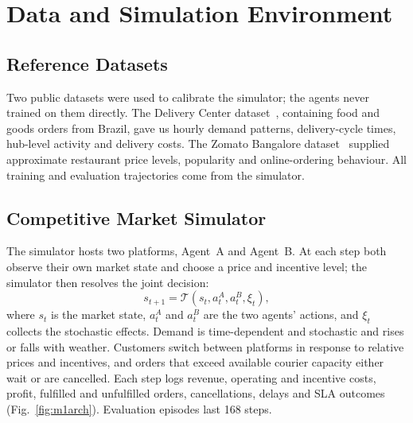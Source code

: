 \documentclass[conference]{IEEEtran}
\begin{document}
\section{Data and Simulation Environment}

\subsection{Reference Datasets}
Two public datasets were used to calibrate the simulator; the agents never trained on them directly. The Delivery Center dataset~\cite{deliverycenter}, containing food and goods orders from Brazil, gave us hourly demand patterns, delivery-cycle times, hub-level activity and delivery costs. The Zomato Bangalore dataset~\cite{zomato} supplied approximate restaurant price levels, popularity and online-ordering behaviour. All training and evaluation trajectories come from the simulator.

\subsection{Competitive Market Simulator}
The simulator hosts two platforms, Agent~A and Agent~B. At each step both observe their own market state and choose a price and incentive level; the simulator then resolves the joint decision:
\begin{equation}
  s_{t+1} = \mathcal{T}\left(s_t, a_t^{A}, a_t^{B}, \xi_t\right),
\end{equation}
where $s_t$ is the market state, $a_t^{A}$ and $a_t^{B}$ are the two agents' actions, and $\xi_t$ collects the stochastic effects. Demand is time-dependent and stochastic and rises or falls with weather. Customers switch between platforms in response to relative prices and incentives, and orders that exceed available courier capacity either wait or are cancelled. Each step logs revenue, operating and incentive costs, profit, fulfilled and unfulfilled orders, cancellations, delays and SLA outcomes (Fig.~\ref{fig:m1arch}). Evaluation episodes last 168 steps.
\end{document}
